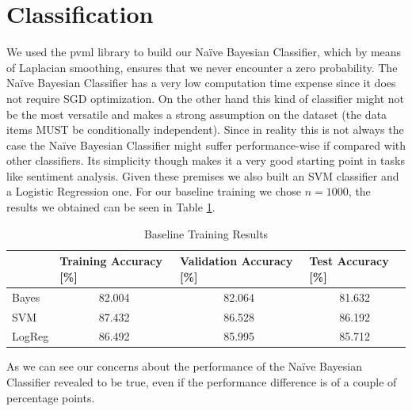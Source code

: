 \documentclass[10pt,a4paper]{report}
\begin{document}
\section{Classification}
We used the pvml library to build our Na\"{i}ve Bayesian Classifier, which by means of Laplacian smoothing, ensures that we never encounter a zero probability. The Na\"{i}ve Bayesian Classifier has a very low computation time expense since it does not require SGD optimization. On the other hand this kind of classifier might not be the most versatile and makes a strong assumption on the dataset (the data items MUST be conditionally independent). Since in reality this is not always the case the Na\"{i}ve Bayesian Classifier might suffer performance-wise if compared with other classifiers. Its simplicity though makes it a very good starting point in tasks like sentiment analysis. Given these premises we also built an SVM classifier and a Logistic Regression one. For our baseline training we chose $n=1000$, the results we obtained can be seen in Table \ref{tab:baseline_training}.
\begin{table}[!ht]
\centering
\begin{tabular}{|l|c|c|c|}
\hline
 & \multicolumn{1}{l|}{Training Accuracy {[}\%{]}} & \multicolumn{1}{l|}{Validation Accuracy {[}\%{]}} & \multicolumn{1}{l|}{Test Accuracy {[}\%{]}} \\ \hline
Bayes  & 82.004 & 82.064 & 81.632 \\ \hline
SVM    & 87.432 & 86.528 & 86.192 \\ \hline
LogReg & 86.492 & 85.995 & 85.712 \\ \hline
\end{tabular}
\caption{Baseline Training Results}
\label{tab:baseline_training}
\end{table}
As we can see our concerns about the performance of the Na\"{i}ve Bayesian Classifier revealed to be true, even if the performance difference is of a couple of percentage points.
\end{document}
